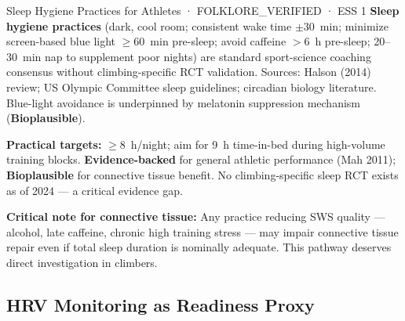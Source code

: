 \begin{folklorebox}{Sleep Hygiene Practices for Athletes · FOLKLORE\_VERIFIED · ESS 1}
\textbf{Sleep hygiene practices} (dark, cool room; consistent wake time $\pm$30~min; minimize screen-based blue light $\geq$60~min pre-sleep; avoid caffeine $>$6~h pre-sleep; 20--30~min nap to supplement poor nights) are standard sport-science coaching consensus without climbing-specific RCT validation. Sources: Halson (2014) review; US Olympic Committee sleep guidelines; circadian biology literature. Blue-light avoidance is underpinned by melatonin suppression mechanism (\textbf{Bioplausible}).
\end{folklorebox}

\textbf{Practical targets:} $\geq$8~h/night; aim for 9~h time-in-bed during high-volume training blocks. \textbf{Evidence-backed} for general athletic performance (Mah 2011); \textbf{Bioplausible} for connective tissue benefit. No climbing-specific sleep RCT exists as of 2024 --- a critical evidence gap.

\textbf{Critical note for connective tissue:} Any practice reducing SWS quality --- alcohol, late caffeine, chronic high training stress --- may impair connective tissue repair even if total sleep duration is nominally adequate. This pathway deserves direct investigation in climbers.

\subsection{HRV Monitoring as Readiness Proxy}

